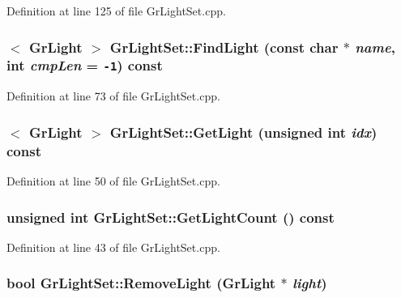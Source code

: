 Definition at line 125 of file GrLightSet.cpp.\hypertarget{class_gr_light_set_39b0504fea42913aa6b969a32595685e}{
\subsubsection[{FindLight}]{$<$ {\bf GrLight} $>$ GrLightSet::FindLight (const char $\ast$ {\em name}, \/  int {\em cmpLen} = {\tt -1}) const}}
\label{class_gr_light_set_39b0504fea42913aa6b969a32595685e}




Definition at line 73 of file GrLightSet.cpp.\hypertarget{class_gr_light_set_d51c91ea2e968be0162405c7ebb2fd6f}{
\subsubsection[{GetLight}]{$<$ {\bf GrLight} $>$ GrLightSet::GetLight (unsigned int {\em idx}) const}}
\label{class_gr_light_set_d51c91ea2e968be0162405c7ebb2fd6f}




Definition at line 50 of file GrLightSet.cpp.\hypertarget{class_gr_light_set_84ba0f2e031e85dd61804cb4576162d4}{
\subsubsection[{GetLightCount}]{\setlength{\rightskip}{0pt plus 5cm}unsigned int GrLightSet::GetLightCount () const}}
\label{class_gr_light_set_84ba0f2e031e85dd61804cb4576162d4}




Definition at line 43 of file GrLightSet.cpp.\hypertarget{class_gr_light_set_2d133642b03d6180270899da9d6b6823}{
\subsubsection[{RemoveLight}]{\setlength{\rightskip}{0pt plus 5cm}bool GrLightSet::RemoveLight ({\bf GrLight} $\ast$ {\em light})}}
\label{class_gr_light_set_2d133642b03d6180270899da9d6b6823}




